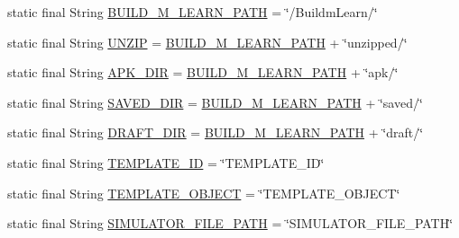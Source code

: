 \begin{DoxyCompactItemize}
\item 
static final String \hyperlink{classorg_1_1buildmlearn_1_1toolkit_1_1constant_1_1Constants_a9965876f735c5e8a6b5b1b187878da87}{B\+U\+I\+L\+D\+\_\+\+M\+\_\+\+L\+E\+A\+R\+N\+\_\+\+P\+A\+TH} = \char`\"{}/Buildm\+Learn/\char`\"{}
\item 
static final String \hyperlink{classorg_1_1buildmlearn_1_1toolkit_1_1constant_1_1Constants_aa7187aa1863aeed8b73d71e3d203fe3c}{U\+N\+Z\+IP} = \hyperlink{classorg_1_1buildmlearn_1_1toolkit_1_1constant_1_1Constants_a9965876f735c5e8a6b5b1b187878da87}{B\+U\+I\+L\+D\+\_\+\+M\+\_\+\+L\+E\+A\+R\+N\+\_\+\+P\+A\+TH} + \char`\"{}unzipped/\char`\"{}
\item 
static final String \hyperlink{classorg_1_1buildmlearn_1_1toolkit_1_1constant_1_1Constants_ad32e350b2a3bc331971d274727ce69c5}{A\+P\+K\+\_\+\+D\+IR} = \hyperlink{classorg_1_1buildmlearn_1_1toolkit_1_1constant_1_1Constants_a9965876f735c5e8a6b5b1b187878da87}{B\+U\+I\+L\+D\+\_\+\+M\+\_\+\+L\+E\+A\+R\+N\+\_\+\+P\+A\+TH} + \char`\"{}apk/\char`\"{}
\item 
static final String \hyperlink{classorg_1_1buildmlearn_1_1toolkit_1_1constant_1_1Constants_a657c90b7a9ba3bfd833cead98e2d9841}{S\+A\+V\+E\+D\+\_\+\+D\+IR} = \hyperlink{classorg_1_1buildmlearn_1_1toolkit_1_1constant_1_1Constants_a9965876f735c5e8a6b5b1b187878da87}{B\+U\+I\+L\+D\+\_\+\+M\+\_\+\+L\+E\+A\+R\+N\+\_\+\+P\+A\+TH} + \char`\"{}saved/\char`\"{}
\item 
static final String \hyperlink{classorg_1_1buildmlearn_1_1toolkit_1_1constant_1_1Constants_a09f2b77cdd891681a33d80eb527b5803}{D\+R\+A\+F\+T\+\_\+\+D\+IR} = \hyperlink{classorg_1_1buildmlearn_1_1toolkit_1_1constant_1_1Constants_a9965876f735c5e8a6b5b1b187878da87}{B\+U\+I\+L\+D\+\_\+\+M\+\_\+\+L\+E\+A\+R\+N\+\_\+\+P\+A\+TH} + \char`\"{}draft/\char`\"{}
\item 
static final String \hyperlink{classorg_1_1buildmlearn_1_1toolkit_1_1constant_1_1Constants_a2ee9d59d6a353dc4664ed2e2086dae9d}{T\+E\+M\+P\+L\+A\+T\+E\+\_\+\+ID} = \char`\"{}T\+E\+M\+P\+L\+A\+T\+E\+\_\+\+ID\char`\"{}
\item 
static final String \hyperlink{classorg_1_1buildmlearn_1_1toolkit_1_1constant_1_1Constants_a9e2658a69f3f70584955bbdc947ca0bc}{T\+E\+M\+P\+L\+A\+T\+E\+\_\+\+O\+B\+J\+E\+CT} = \char`\"{}T\+E\+M\+P\+L\+A\+T\+E\+\_\+\+O\+B\+J\+E\+CT\char`\"{}
\item 
static final String \hyperlink{classorg_1_1buildmlearn_1_1toolkit_1_1constant_1_1Constants_a5e8ea6ec23e727cbfc84e5b854ae311c}{S\+I\+M\+U\+L\+A\+T\+O\+R\+\_\+\+F\+I\+L\+E\+\_\+\+P\+A\+TH} = \char`\"{}S\+I\+M\+U\+L\+A\+T\+O\+R\+\_\+\+F\+I\+L\+E\+\_\+\+P\+A\+TH\char`\"{}

\end{DoxyCompactItemize}
